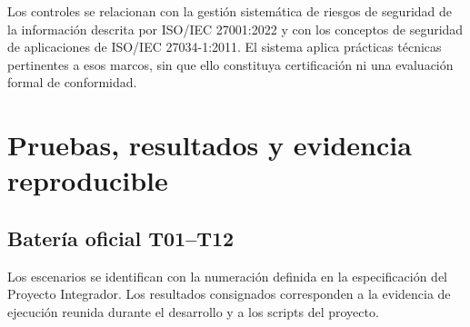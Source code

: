 \documentclass[11pt,a4paper,oneside]{article}
\begin{document}
Los controles se relacionan con la gestión sistemática de riesgos de seguridad de la información descrita por ISO/IEC 27001:2022 y con los conceptos de seguridad de aplicaciones de ISO/IEC 27034-1:2011. El sistema aplica prácticas técnicas pertinentes a esos marcos, sin que ello constituya certificación ni una evaluación formal de conformidad.

\section{Pruebas, resultados y evidencia reproducible}
\subsection{Batería oficial T01--T12}
Los escenarios se identifican con la numeración definida en la especificación del Proyecto Integrador. Los resultados consignados corresponden a la evidencia de ejecución reunida durante el desarrollo y a los scripts del proyecto.
\end{document}
